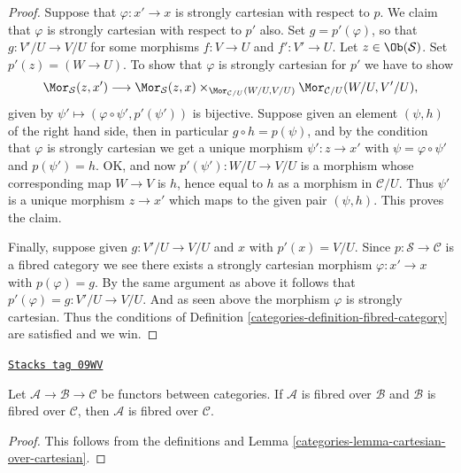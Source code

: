 \begin{proof}

Suppose that $\varphi : x' \to x$ is strongly cartesian with respect to $p$.
We claim that $\varphi$ is strongly cartesian with respect to $p'$ also.
Set $g = p'(\varphi)$, so that $g : V'/U \to V/U$
for some morphisms $f : V \to U$ and $f' : V' \to U$.
Let $z \in \Ob(\mathcal{S})$. Set $p'(z) = (W \to U)$.
To show that $\varphi$ is strongly cartesian for $p'$ we have to show
$$
\Mor_\mathcal{S}(z, x')
\longrightarrow
\Mor_\mathcal{S}(z, x)
\times_{\Mor_{\mathcal{C}/U}(W/U, V/U)}
\Mor_{\mathcal{C}/U}(W/U, V'/U),
$$
given by $\psi' \longmapsto (\varphi \circ \psi', p'(\psi'))$
is bijective. Suppose given an element $(\psi, h)$ of the
right hand side, then in particular $g \circ h = p(\psi)$,
and by the condition that $\varphi$ is strongly cartesian we
get a unique morphism $\psi' : z \to x'$ with $\psi = \varphi \circ \psi'$
and $p(\psi') = h$. OK, and now $p'(\psi') : W/U \to V/U$
is a morphism whose corresponding map $W \to V$ is $h$, hence
equal to $h$ as a morphism in $\mathcal{C}/U$. Thus $\psi'$ is
a unique morphism $z \to x'$ which maps to the given pair $(\psi, h)$.
This proves the claim.

\medskip\noindent
Finally, suppose given $g : V'/U \to V/U$ and $x$ with $p'(x) = V/U$.
Since $p : \mathcal{S} \to \mathcal{C}$ is a fibred category we
see there exists a strongly cartesian morphism $\varphi : x' \to x$
with $p(\varphi) = g$. By the same argument as above it follows
that $p'(\varphi) = g : V'/U \to V/U$. And as seen above the morphism
$\varphi$ is strongly cartesian. Thus the conditions of
Definition \ref{categories-definition-fibred-category} are satisfied and we win.
\end{proof}

\begin{lemma}
\label{categories-lemma-fibred-over-fibred}
\href{https://stacks.math.columbia.edu/tag/09WV}{\texttt{Stacks tag 09WV}}

Let $\mathcal{A} \to \mathcal{B} \to \mathcal{C}$ be functors between
categories. If $\mathcal{A}$ is fibred over $\mathcal{B}$ and
$\mathcal{B}$ is fibred over $\mathcal{C}$, then $\mathcal{A}$
is fibred over $\mathcal{C}$.
\end{lemma}

\begin{proof}

This follows from the definitions and
Lemma \ref{categories-lemma-cartesian-over-cartesian}.
\end{proof}

